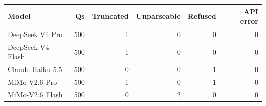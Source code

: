 \begin{tabular}{lrrrrr}
\toprule
Model & Qs & Truncated & Unparseable & Refused & API error \\
\midrule
DeepSeek V4 Pro & 500 & 1 & 0 & 0 & 0 \\
DeepSeek V4 Flash & 500 & 1 & 0 & 0 & 0 \\
Claude Haiku 5.5 & 500 & 0 & 0 & 1 & 0 \\
MiMo-V2.6 Pro & 500 & 1 & 0 & 1 & 0 \\
MiMo-V2.6 Flash & 500 & 0 & 2 & 0 & 0 \\
\bottomrule
\end{tabular}
